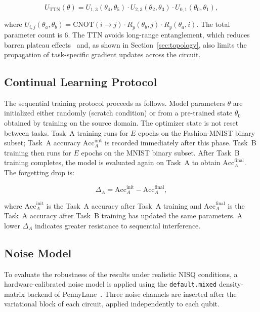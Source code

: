 \documentclass[10pt,conference]{IEEEtran}
\begin{document}
\begin{equation}
  U_\text{TTN}(\theta) =
  U_{1,3}(\theta_4, \theta_5)
  \cdot U_{2,3}(\theta_2, \theta_3)
  \cdot U_{0,1}(\theta_0, \theta_1),
  \label{eq:ttn}
\end{equation}

where $U_{i,j}(\theta_a, \theta_b) = \text{CNOT}(i \to j) \cdot
R_y(\theta_b, j) \cdot R_y(\theta_a, i)$. The total parameter count is
6. The TTN avoids long-range entanglement, which reduces barren plateau
effects~\cite{pesah2021absence,grant2018hierarchical} and, as shown in
Section~\ref{sec:topology}, also limits the propagation of
task-specific gradient updates across the circuit.

\subsection{Continual Learning Protocol}

The sequential training protocol proceeds as follows. Model parameters
$\theta$ are initialized either randomly (scratch condition) or from a
pre-trained state $\theta_0$ obtained by training on the source domain.
The optimizer state is not reset between tasks. Task~A training runs
for $E$ epochs on the Fashion-MNIST binary subset; Task~A accuracy
$\text{Acc}_A^\text{init}$ is recorded immediately after this phase.
Task~B training then runs for $E$ epochs on the MNIST binary subset.
After Task~B training completes, the model is evaluated again on
Task~A to obtain $\text{Acc}_A^\text{final}$. The forgetting drop is:

\begin{equation}
  \Delta_A = \text{Acc}_A^\text{init} - \text{Acc}_A^\text{final},
  \label{eq:forgetting}
\end{equation}

where $\text{Acc}_A^\text{init}$ is the Task~A accuracy after Task~A
training and $\text{Acc}_A^\text{final}$ is the Task~A accuracy after
Task~B training has updated the same parameters. A lower $\Delta_A$
indicates greater resistance to sequential interference.

\subsection{Noise Model}

To evaluate the robustness of the results under realistic NISQ
conditions, a hardware-calibrated noise model is applied using the
\texttt{default.mixed} density-matrix backend of
PennyLane~\cite{bergholm2018pennylane}. Three noise channels are
inserted after the variational block of each circuit, applied
independently to each qubit.
\end{document}
